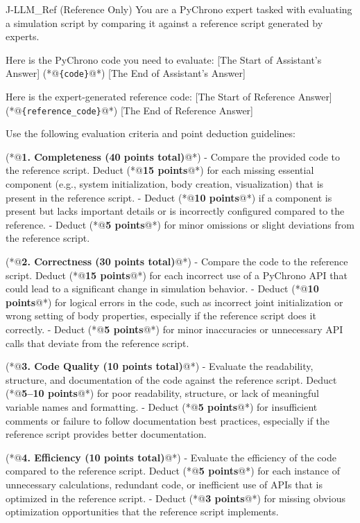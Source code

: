 \documentclass{ieeeaccess}
\begin{document}
\begin{appendices}
\begin{PromptBlock}{J-LLM\_Ref (Reference Only)}
You are a PyChrono expert tasked with evaluating a simulation script by comparing it against a reference script generated by experts.

Here is the PyChrono code you need to evaluate:
[The Start of Assistant's Answer]
(*@\texttt{\{code\}}@*)
[The End of Assistant's Answer]

Here is the expert-generated reference code:
[The Start of Reference Answer]
(*@\texttt{\{reference\_code\}}@*)
[The End of Reference Answer]

Use the following evaluation criteria and point deduction guidelines:

(*@\textbf{1. Completeness (40 points total)}@*)
- Compare the provided code to the reference script. Deduct (*@\textbf{15 points}@*) for each missing essential component (e.g., system initialization, body creation, visualization) that is present in the reference script.
- Deduct (*@\textbf{10 points}@*) if a component is present but lacks important details or is incorrectly configured compared to the reference.
- Deduct (*@\textbf{5 points}@*) for minor omissions or slight deviations from the reference script.

(*@\textbf{2. Correctness (30 points total)}@*)
- Compare the code to the reference script. Deduct (*@\textbf{15 points}@*) for each incorrect use of a PyChrono API that could lead to a significant change in simulation behavior.
- Deduct (*@\textbf{10 points}@*) for logical errors in the code, such as incorrect joint initialization or wrong setting of body properties, especially if the reference script does it correctly.
- Deduct (*@\textbf{5 points}@*) for minor inaccuracies or unnecessary API calls that deviate from the reference script.

(*@\textbf{3. Code Quality (10 points total)}@*)
- Evaluate the readability, structure, and documentation of the code against the reference script. Deduct (*@\textbf{5--10 points}@*) for poor readability, structure, or lack of meaningful variable names and formatting.
- Deduct (*@\textbf{5 points}@*) for insufficient comments or failure to follow documentation best practices, especially if the reference script provides better documentation.

(*@\textbf{4. Efficiency (10 points total)}@*)
- Evaluate the efficiency of the code compared to the reference script. Deduct (*@\textbf{5 points}@*) for each instance of unnecessary calculations, redundant code, or inefficient use of APIs that is optimized in the reference script.
- Deduct (*@\textbf{3 points}@*) for missing obvious optimization opportunities that the reference script implements.


\end{PromptBlock}
\end{appendices}
\end{document}
